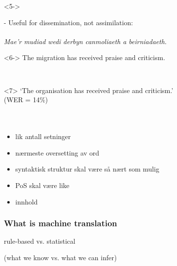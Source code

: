 \documentclass{beamer}
\begin{document}
\begin{frame}
\begin{onlyenv}<5->

- Useful for dissemination, not assimilation:\\
~\\
\emph{Mae'r \alert<7>{mudiad} wedi derbyn canmoliaeth a beirniadaeth.}\\
\end{onlyenv}

\begin{onlyenv}<6->
The \alert<7>{migration} has received praise and criticism.\\
\end{onlyenv}

~\\
\begin{onlyenv}<7>
`The \alert<7>{organisation} has received praise and criticism.'\\ (WER = 14\%)\\
\end{onlyenv}

~\\

\end{frame}

\begin{frame}
\frametitle{}
\begin{itemize}
  \item lik antall setninger
  \item nærmeste oversetting av ord
  \item syntaktisk struktur skal være så nært som mulig
  \item PoS skal være like
  \item innhold
\end{itemize}
\end{frame}


\begin{frame}
\frametitle{What is machine translation}

  \begin{centering}

    {\Large rule-based vs. statistical}

    (what we know vs. what we can infer)

  \end{centering}

\end{frame}
\end{document}
